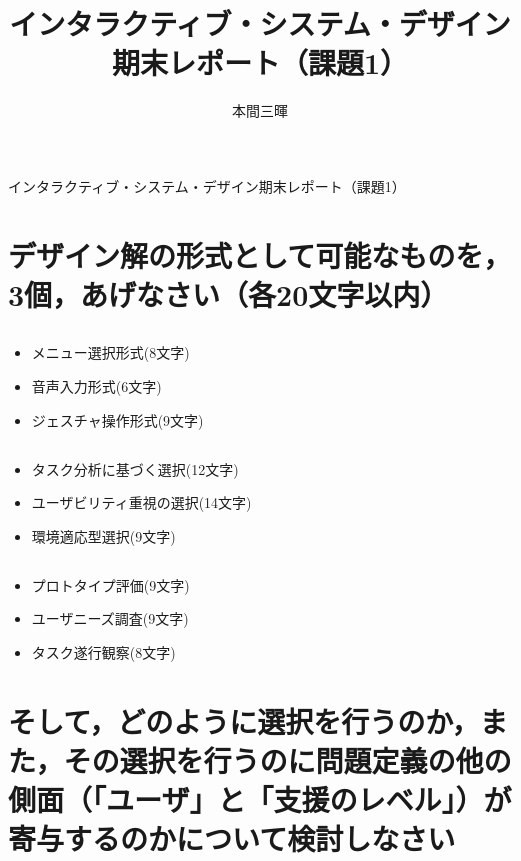 \documentclass[titlepage,a4paper]{jsarticle}
\title{インタラクティブ・システム・デザイン期末レポート（課題1）}
\author{本間三暉}
\renewcommand{\thesubsection}{\thesection-\arabic{subsection})}
\begin{document}
\maketitle
\begin{center}
  インタラクティブ・システム・デザイン期末レポート（課題1）
\end{center}
\section{デザイン解の形式として可能なものを，3個，あげなさい（各20文字以内）}
\subsection{ }
\begin{itemize}
  \item メニュー選択形式(8文字)
  \item 音声入力形式(6文字)
  \item ジェスチャ操作形式(9文字)
\end{itemize}

\subsection{ }
\begin{itemize}
  \item タスク分析に基づく選択(12文字)
  \item ユーザビリティ重視の選択(14文字)
  \item 環境適応型選択(9文字)
\end{itemize}

\subsection{ }
\begin{itemize}
  \item プロトタイプ評価(9文字)
  \item ユーザニーズ調査(9文字)
  \item タスク遂行観察(8文字)
\end{itemize}

\section{そして，どのように選択を行うのか，また，その選択を行うのに問題定義の他の側面（「ユーザ」と「支援のレベル」）が寄与するのかについて検討しなさい}
\renewcommand{\thesubsection}{\thesection)}
\end{document}
